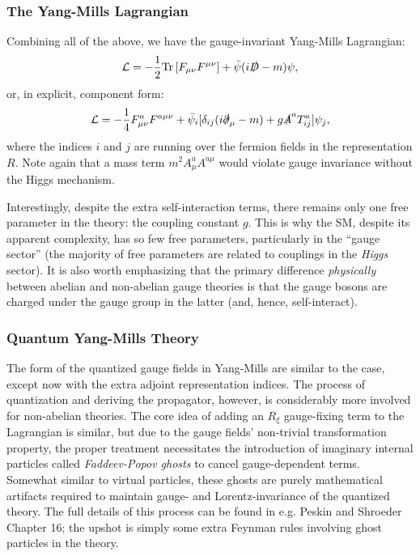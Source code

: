 \subsubsection{The Yang-Mills Lagrangian}

Combining all of the above, we have the gauge-invariant Yang-Mills Lagrangian:
\begin{equation}
	\label{eq:01_qft_gt_yangmills_lagrangian}
	\mathcal L = -\frac{1}{2}\tr{F_{\mu\nu}F^{\mu\nu}} + \bar\psi(i\cslashed D - m)\psi,
\end{equation}
or, in explicit, component form:
\begin{equation}
	\label{eq:01_qft_gt_yangmills_lagrangian_explicit}
	\mathcal L = -\frac{1}{4}F_{\mu\nu}^aF^{a\mu\nu} + \bar\psi_i[\delta_{ij}(i\cslashed \partial_\mu - m) + g\cslashed A^aT_{ij}^a]\psi_j,
\end{equation}
where the indices $i$ and $j$ are running over the fermion fields in the representation $R$.
Note again that a mass term $m^2A_\mu^aA^{a\mu}$ would violate gauge invariance without the Higgs mechanism.

Interestingly, despite the extra self-interaction terms, there remains only one free parameter in the theory: the coupling constant $g$.
This is why the SM, despite its apparent complexity, has so few free parameters, particularly in the ``gauge sector'' (the majority of free parameters are related to couplings in the \textit{Higgs} sector).
It is also worth emphasizing that the primary difference \textit{physically} between abelian and non-abelian gauge theories is that the gauge bosons are charged under the gauge group in the latter (and, hence, self-interact).



\subsubsection{Quantum Yang-Mills Theory}
\label{sec:01_qft_gt_ymquant}

The form of the quantized gauge fields in Yang-Mills are similar to the \UU[1] case, except now with the extra adjoint representation indices.
The process of quantization and deriving the propagator, however, is considerably more involved for non-abelian theories.
The core idea of adding an $R_\xi$ gauge-fixing term to the Lagrangian is similar, but due to the gauge fields' non-trivial transformation property, the proper treatment necessitates the introduction of imaginary internal particles called \textit{Faddeev-Popov ghosts} to cancel gauge-dependent terms.
Somewhat similar to virtual particles, these ghosts are purely mathematical artifacts required to maintain gauge- and Lorentz-invariance of the quantized theory.
The full details of this process can be found in e.g. Peskin and Shroeder~\cite{Peskin:1995ev} Chapter 16; the upshot is simply some extra Feynman rules involving ghost particles in the theory.

